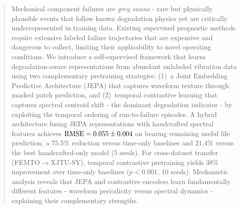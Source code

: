 \begin{abstract}
Mechanical component failures are \emph{grey swans} - rare but physically plausible events that follow known degradation physics yet are critically underrepresented in training data.
Existing supervised prognostic methods require extensive labeled failure trajectories that are expensive and dangerous to collect, limiting their applicability to novel operating conditions.
We introduce a self-supervised framework that learns degradation-aware representations from abundant unlabeled vibration data using two complementary pretraining strategies: (1)~a Joint Embedding Predictive Architecture (JEPA) that captures waveform texture through masked patch prediction, and (2)~temporal contrastive learning that captures spectral centroid shift - the dominant degradation indicator - by exploiting the temporal ordering of run-to-failure episodes.
A hybrid architecture fusing JEPA representations with handcrafted spectral features achieves $\rmse = 0.055 \pm 0.004$ on bearing remaining useful life prediction, a $75.5\%$ reduction versus time-only baselines and $21.4\%$ versus the best handcrafted-only model (5 seeds).
For cross-dataset transfer (FEMTO$\to$XJTU-SY), temporal contrastive pretraining yields $38\%$ improvement over time-only baselines ($p < 0.001$, 10 seeds).
Mechanistic analysis reveals that JEPA and contrastive encoders learn fundamentally different features - waveform periodicity versus spectral dynamics - explaining their complementary strengths.
\end{abstract}
